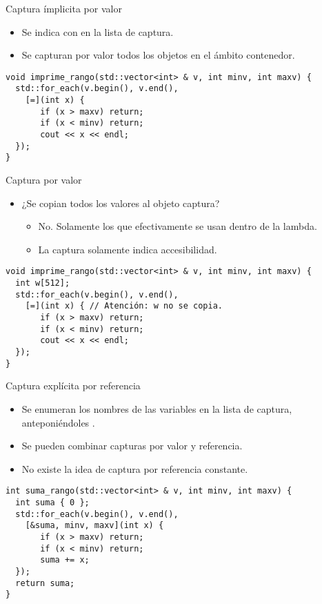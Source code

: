 \begin{frame}[t,fragile]{Captura ímplicita por valor}
  \begin{itemize}
    \item Se indica con \cppid{=} en la lista de captura.
    \item Se capturan por valor todos los objetos en el ámbito contenedor.
  \end{itemize}
\pause
\begin{lstlisting}[escapechar=@]
void imprime_rango(std::vector<int> & v, int minv, int maxv) {
  std::for_each(v.begin(), v.end(),
    [=](int x) { 
       if (x > maxv) return;
       if (x < minv) return;
       cout << x << endl;
  });
}
\end{lstlisting}
\end{frame}

\begin{frame}[t,fragile]{Captura por valor}
  \begin{itemize}
    \item ¿Se copian todos los valores al objeto captura?
      \begin{itemize}
        \item \pause No. Solamente los que efectivamente se usan dentro de la lambda.
        \item La captura solamente indica accesibilidad.
      \end{itemize}
  \end{itemize}
\pause
\begin{lstlisting}[escapechar=@]
void imprime_rango(std::vector<int> & v, int minv, int maxv) {
  int w[512];
  std::for_each(v.begin(), v.end(),
    [=](int x) { // Atención: w no se copia.
       if (x > maxv) return;
       if (x < minv) return;
       cout << x << endl;
  });
}
\end{lstlisting}
\end{frame}

\begin{frame}[t,fragile]{Captura explícita por referencia}
  \begin{itemize}
    \item Se enumeran los nombres de las variables en la lista de captura, anteponiéndoles \cppid{\&}.
    \item Se pueden combinar capturas por valor y referencia.
    \item No existe la idea de captura por referencia constante.
  \end{itemize}
\pause
\begin{lstlisting}[escapechar=@]
int suma_rango(std::vector<int> & v, int minv, int maxv) {
  int suma { 0 };
  std::for_each(v.begin(), v.end(),
    [&suma, minv, maxv](int x) {
       if (x > maxv) return;
       if (x < minv) return;
       suma += x;
  });
  return suma;
}
\end{lstlisting}
\end{frame}

